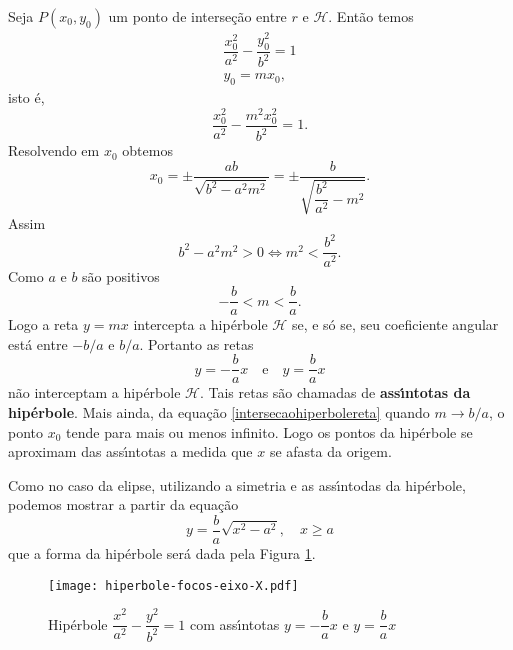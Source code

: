 Seja $P(x_0,y_0)$ um ponto de interse\c{c}\~ao entre $r$ e $\mathcal{H}$. Ent\~ao temos
\begin{align*}
  \dfrac{x_0^2}{a^2} - \dfrac{y_0^2}{b^2} = 1\\
  y_0 = mx_0,
\end{align*}
isto \'e,
\[
  \dfrac{x_0^2}{a^2} - \dfrac{m^2x_0^2}{b^2} = 1.
\]
Resolvendo em $x_0$ obtemos
\begin{equation}\label{intersecaohiperbolereta}
x_0 = \pm \dfrac{ab}{\sqrt{b^2 - a^2m^2}} = \pm \dfrac{b}{\sqrt{\dfrac{b^2}{a^2} - m^2}}.
\end{equation}
Assim
\[
  b^2 - a^2m^2 > 0 \Leftrightarrow m^2 < \dfrac{b^2}{a^2}.
\]
Como $a$ e $b$ s\~ao positivos
\[
  -\dfrac{b}{a} < m < \dfrac{b}{a}.
\]
Logo a reta $y = mx$ intercepta a hip\'erbole $\mathcal{H}$ se, e s\'o se, seu coeficiente angular est\'a entre $-b/a$ e $b/a$. Portanto as retas
\[
  y = -\dfrac{b}{a}x \quad \mbox{e}\quad y = \dfrac{b}{a}x
\]
n\~ao interceptam a hip\'erbole $\mathcal{H}$. Tais retas s\~ao chamadas de \textbf{ass{\'\i}ntotas da hip\'erbole}. Mais ainda, da equa\c{c}\~ao \eqref{intersecaohiperbolereta} quando $m \to b/a$, o ponto $x_0$ tende para mais ou menos infinito. Logo os pontos da hip\'erbole se aproximam das ass{\'\i}ntotas a medida que $x$ se afasta da origem.

Como no caso da elipse, utilizando a simetria e as ass{\'\i}ntodas da hip\'erbole, podemos mostrar a partir da equa\c{c}\~ao
\[
  y = \dfrac{b}{a}\sqrt{x^2 - a^2}, \quad x \ge a
\]
que a forma da hip\'erbole ser\'a dada pela Figura \ref{FormageralHiperbole}.
\begin{figure}[!h]
  \centering
  \caption{Hip\'erbole $\dfrac{x^2}{a^2} - \dfrac{y^2}{b^2} = 1$  com ass{\'\i}ntotas $y = -\dfrac{b}{a}x$ e $y = \dfrac{b}{a}x$}
  \label{FormageralHiperbole}
  \texttt{[image: hiperbole-focos-eixo-X.pdf]}
\end{figure}

